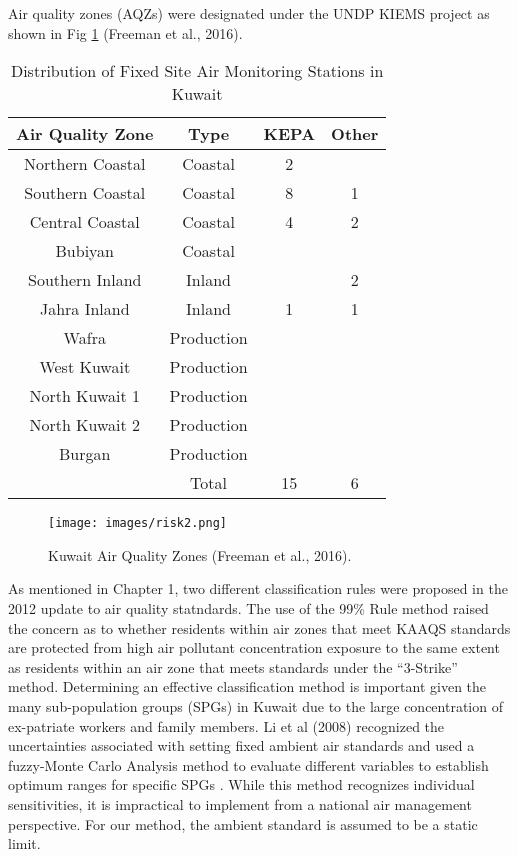 Air quality zones (AQZs) were designated under the UNDP KIEMS project as shown in Fig \ref{fig2:aqzkuwait} (Freeman et al., 2016).
%
\begin{table}[!htb]
\centering
\caption{Distribution of Fixed Site Air Monitoring Stations in Kuwait}
\label{tb:2ams}
\begin{tabular}{@{}cccc@{}}
\toprule
\textbf{Air Quality Zone} & \textbf{Type} & \textbf{KEPA} & \textbf{Other} \\ \midrule
Northern Coastal & Coastal & 2 &  \\
Southern Coastal & Coastal & 8 & 1 \\
Central Coastal & Coastal & 4 & 2 \\
Bubiyan & Coastal &  &  \\
Southern Inland & Inland &  & 2 \\
Jahra Inland & Inland & 1 & 1 \\
Wafra & Production &  &  \\
West Kuwait & Production &  &  \\
North Kuwait 1 & Production &  &  \\
North Kuwait 2 & Production &  &  \\
Burgan & Production &  &  \\
 & Total & 15 & 6 \\ \bottomrule
\end{tabular}
\end{table}

%  
\begin{figure}
\texttt{[image: images/risk2.png]} 
\caption[Kuwait Air Quality Zones]{Kuwait Air Quality Zones (Freeman et al., 2016).}
\label{fig2:aqzkuwait}
\end{figure}

As mentioned in Chapter 1, two different classification rules were proposed in the 2012 update to air quality statndards. The use of the 99\% Rule method raised the concern as to whether residents within air zones that meet KAAQS standards are protected from high air pollutant concentration exposure to the same extent as residents within an air zone that meets standards under the ``3-Strike” method. Determining an effective classification method is important given the many sub-population groups (SPGs) in Kuwait due to the large concentration of ex-patriate workers and family members. Li et al (2008) recognized the uncertainties associated with setting fixed ambient air standards and used a fuzzy-Monte Carlo Analysis method to evaluate different variables to establish optimum ranges for specific SPGs \citep{Li2008}. While this method recognizes individual sensitivities, it is impractical to implement from a national air management perspective. For our method, the ambient standard is assumed to be a static limit.

